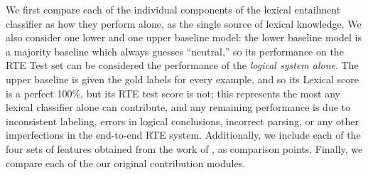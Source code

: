 We first compare each of the individual components of the lexical entailment
classifier as how they perform alone, as the single source of lexical
knowledge. We also consider one lower and one upper baseline model: the lower
baseline model is a majority baseline which always guesses ``neutral,''
so its performance on the RTE Test set can be considered the performance
of the {\em logical system alone}. The upper baseline is given the gold
labels for every example, and so its Lexical score is a perfect 100\%,
but its RTE test score is not; this represents the most any lexical classifier
alone can contribute, and any remaining performance is due to inconsistent
labeling, errors in logical conclusions, incorrect parsing, or any other
imperfections in the end-to-end RTE system.
Additionally, we include each of the four sets of features obtained from
the work of , as comparison points. Finally, we
compare each of the our original contribution modules. 

